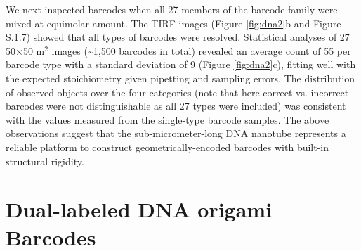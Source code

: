 We next inspected barcodes when all 27 members of the barcode family were mixed at equimolar amount. The TIRF images 
(Figure \ref{fig:dna2}b and Figure S.1.7) showed that all types of barcodes were resolved. Statistical 
analyses of 27 50×50 \textmu m$^2$ images (\textasciitilde1,500 barcodes in total) revealed an 
average count of 55 per barcode type with a standard deviation of 9 (Figure \ref{fig:dna2}c), fitting 
well with the expected stoichiometry given pipetting and sampling errors. The 
distribution of observed objects over the four categories (note that here correct vs. 
incorrect barcodes were not distinguishable as all 27 types were included) was consistent 
with the values measured from the single-type barcode samples. The above observations 
suggest that the sub-micrometer-long DNA nanotube represents a reliable platform to 
construct geometrically-encoded barcodes with built-in structural rigidity. 


\section{Dual-labeled DNA origami Barcodes}

